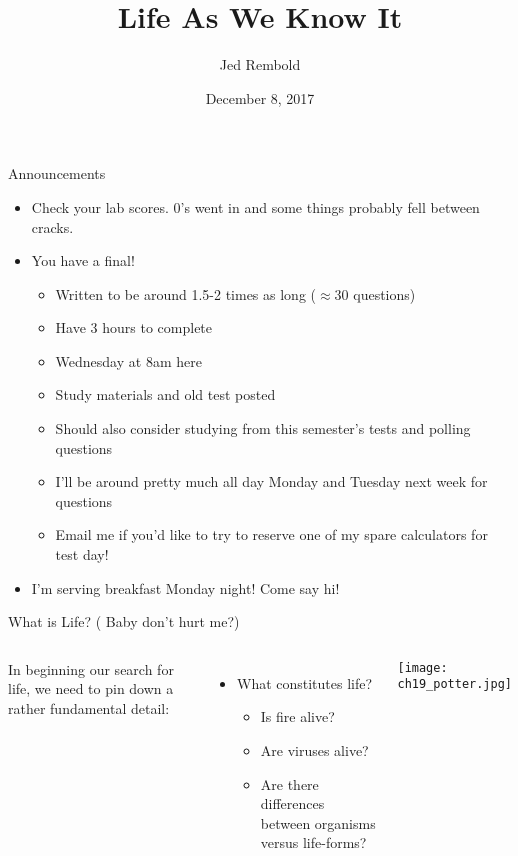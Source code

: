 \documentclass[pdf,aspectratio=169]{beamer}
\title{Life As We Know It}
\date{December 8, 2017}
\author{Jed Rembold}
\begin{document}
\renewcommand*{\theenumi}{\Alph{enumi}}

\begin{frame}{Announcements}
	\begin{itemize}
		\item \alert{Check your lab scores. 0's went in and some things probably fell between cracks.}
		\item You have a final!
			\begin{itemize}
				\item Written to be around 1.5-2 times as long ($\approx 30$ questions)
				\item Have 3 hours to complete
				\item Wednesday at 8am here
				\item Study materials and old test posted
				\item Should also consider studying from this semester's tests and polling questions
				\item I'll be around pretty much all day Monday and Tuesday next week for questions
				\item Email me if you'd like to try to reserve one of my spare calculators for test day!
			\end{itemize}
		\item I'm serving breakfast Monday night! Come say hi!
	\end{itemize}
\end{frame}


\begin{frame}{What is Life? \scriptsize( Baby don't hurt me?)}
  \begin{columns}
	In beginning our search for life, we need to pin down a rather fundamental detail:
	\begin{itemize}
	  \item What constitutes life?
		\begin{itemize}
		  \item Is fire alive?
		  \item Are viruses alive?
		  \item Are there differences between organisms versus life-forms?
		\end{itemize}
	\end{itemize}
	\begin{center}
	  \texttt{[image: ch19\_potter.jpg]}
	\end{center}
  \end{columns}
\end{frame}
\end{document}
